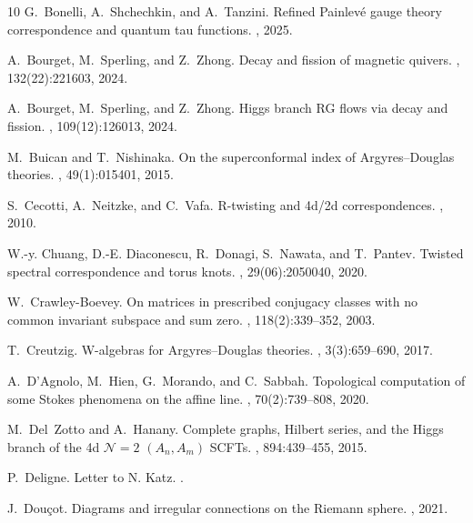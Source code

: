 \documentclass[11pt,a4paper]{amsart}
\numberwithin{equation}{section}
\begin{document}
\begin{thebibliography}{10}
G.~Bonelli, A.~Shchechkin, and A.~Tanzini.
\newblock Refined {P}ainlev{\'e} gauge theory correspondence and quantum tau
  functions.
, 2025.

A.~Bourget, M.~Sperling, and Z.~Zhong.
\newblock Decay and fission of magnetic quivers.
, 132(22):221603, 2024.

A.~Bourget, M.~Sperling, and Z.~Zhong.
\newblock Higgs branch {RG} flows via decay and fission.
, 109(12):126013, 2024.

M.~Buican and T.~Nishinaka.
\newblock On the superconformal index of {A}rgyres--{D}ouglas theories.
,
  49(1):015401, 2015.

S.~Cecotti, A.~Neitzke, and C.~Vafa.
\newblock R-twisting and 4d/2d correspondences.
, 2010.

W.-y. Chuang, D.-E. Diaconescu, R.~Donagi, S.~Nawata, and T.~Pantev.
\newblock Twisted spectral correspondence and torus knots.
, 29(06):2050040,
  2020.

W.~Crawley-Boevey.
\newblock On matrices in prescribed conjugacy classes with no common invariant
  subspace and sum zero.
, 118(2):339--352, 2003.

T.~Creutzig.
\newblock W-algebras for {A}rgyres--{D}ouglas theories.
, 3(3):659--690, 2017.

A.~D'Agnolo, M.~Hien, G.~Morando, and C.~Sabbah.
\newblock Topological computation of some {Stokes} phenomena on the affine
  line.
, 70(2):739--808, 2020.

M.~Del~Zotto and A.~Hanany.
\newblock Complete graphs, {H}ilbert series, and the {H}iggs branch of the 4d
  {$\mathcal N=2$} {$(A_n, A_m)$} {SCFT}s.
, 894:439--455, 2015.

P.~Deligne.
\newblock Letter to {N}. {K}atz.
.

J.~Dou{\c{c}}ot.
\newblock Diagrams and irregular connections on the {R}iemann sphere.
, 2021.


\end{thebibliography}
\end{document}
